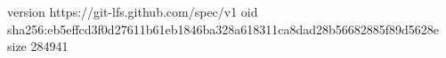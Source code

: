 version https://git-lfs.github.com/spec/v1
oid sha256:eb5effcd3f0d27611b61eb1846ba328a618311ca8dad28b56682885f89d5628e
size 284941
